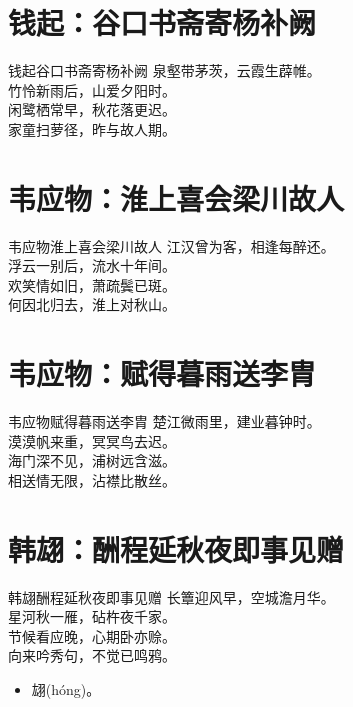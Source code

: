 \documentclass[12pt,oneside,a5paper]{book}
\begin{document}
\chapter{钱起：谷口书斋寄杨补阙}
\begin{poemzh}{钱起}{谷口书斋寄杨补阙}
泉壑带茅茨，云霞生薜帷。\\
竹怜新雨后，山爱夕阳时。\\
闲鹭栖常早，秋花落更迟。\\
家童扫萝径，昨与故人期。\\ 
\end{poemzh}

\chapter{韦应物：淮上喜会梁川故人}
\begin{poemzh}{韦应物}{淮上喜会梁川故人}
江汉曾为客，相逢每醉还。\\
浮云一别后，流水十年间。\\
欢笑情如旧，萧疏鬓已斑。\\
何因北归去，淮上对秋山。\\ 
\end{poemzh}

\chapter{韦应物：赋得暮雨送李胄}
\begin{poemzh}{韦应物}{赋得暮雨送李胄}
楚江微雨里，建业暮钟时。\\
漠漠帆来重，冥冥鸟去迟。\\
海门深不见，浦树远含滋。\\
相送情无限，沾襟比散丝。\\ 
\end{poemzh}

\chapter{韩翃：酬程延秋夜即事见赠}
\begin{poemzh}{韩翃}{酬程延秋夜即事见赠}
长簟迎风早，空城澹月华。\\
星河秋一雁，砧杵夜千家。\\
节候看应晚，心期卧亦赊。\\
向来吟秀句，不觉已鸣鸦。\\ 
\end{poemzh}

\begin{itemize}
\item 翃(hóng)。
\end{itemize}
\end{document}
